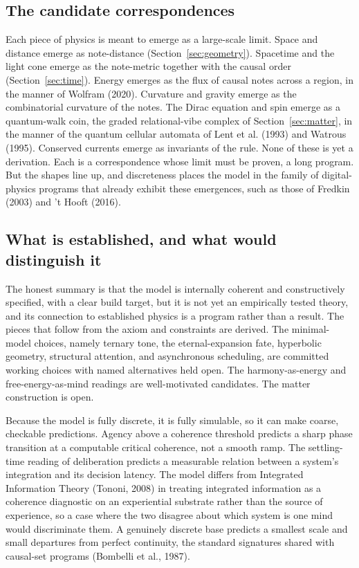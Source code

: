 \subsection{The candidate correspondences}

Each piece of physics is meant to emerge as a large-scale limit. Space and distance emerge as note-distance (Section~\ref{sec:geometry}). Spacetime and the light cone emerge as the note-metric together with the causal order (Section~\ref{sec:time}). Energy emerges as the flux of causal notes across a region, in the manner of Wolfram (2020). Curvature and gravity emerge as the combinatorial curvature of the notes. The Dirac equation and spin emerge as a quantum-walk coin, the graded relational-vibe complex of Section~\ref{sec:matter}, in the manner of the quantum cellular automata of Lent et al. (1993) and Watrous (1995). Conserved currents emerge as invariants of the rule. None of these is yet a derivation. Each is a correspondence whose limit must be proven, a long program. But the shapes line up, and discreteness places the model in the family of digital-physics programs that already exhibit these emergences, such as those of Fredkin (2003) and 't Hooft (2016).

\subsection{What is established, and what would distinguish it}

The honest summary is that the model is internally coherent and constructively specified, with a clear build target, but it is not yet an empirically tested theory, and its connection to established physics is a program rather than a result. The pieces that follow from the axiom and constraints are derived. The minimal-model choices, namely ternary tone, the eternal-expansion fate, hyperbolic geometry, structural attention, and asynchronous scheduling, are committed working choices with named alternatives held open. The harmony-as-energy and free-energy-as-mind readings are well-motivated candidates. The matter construction is open.

Because the model is fully discrete, it is fully simulable, so it can make coarse, checkable predictions. Agency above a coherence threshold predicts a sharp phase transition at a computable critical coherence, not a smooth ramp. The settling-time reading of deliberation predicts a measurable relation between a system's integration and its decision latency. The model differs from Integrated Information Theory (Tononi, 2008) in treating integrated information as a coherence diagnostic on an experiential substrate rather than the source of experience, so a case where the two disagree about which system is one mind would discriminate them. A genuinely discrete base predicts a smallest scale and small departures from perfect continuity, the standard signatures shared with causal-set programs (Bombelli et al., 1987).

